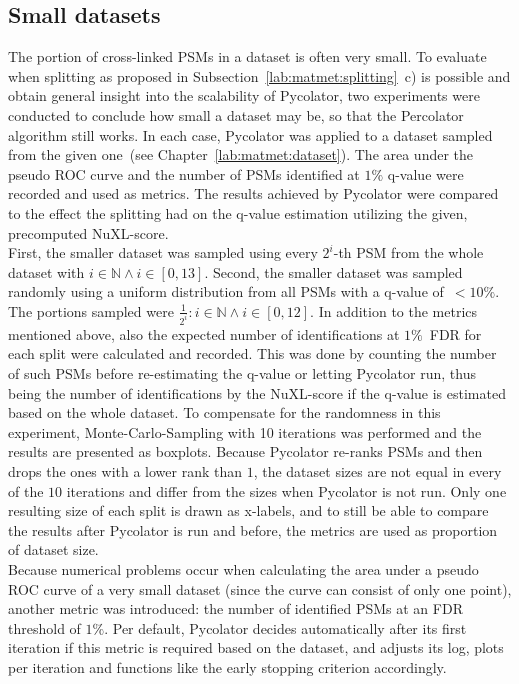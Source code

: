 \subsection{Small datasets}
\label{lab:matmet:small_datasets}
The portion of cross-linked PSMs in a dataset is often very small. To evaluate when splitting as proposed in Subsection~\ref{lab:matmet:splitting}~c) is possible and obtain general insight into the scalability of Pycolator, two experiments were conducted to conclude how small a dataset may be, so that the Percolator algorithm still works. In each case, Pycolator was applied to a dataset sampled from the given one~(see Chapter~\ref{lab:matmet:dataset}). The area under the pseudo ROC curve and the number of PSMs identified at $1\%$ q-value were recorded and used as metrics. The results achieved by Pycolator were compared to the effect the splitting had on the q-value estimation utilizing the given, precomputed NuXL-score.\\
First, the smaller dataset was sampled using every $2^i$-th PSM from the whole dataset with $i\in\mathbb{N} \land i\in[0,13]$. Second, the smaller dataset was sampled randomly using a uniform distribution from all PSMs with a q-value of~$<10\%$. The portions sampled were $\frac{1}{2^i} : i\in\mathbb{N} \land i\in[0,12]$. In addition to the metrics mentioned above, also the expected number of identifications at $1\%$~FDR for each split were calculated and recorded. This was done by counting the number of such PSMs before re-estimating the q-value or letting Pycolator run, thus being the number of identifications by the NuXL-score if the q-value is estimated based on the whole dataset.
To compensate for the randomness in this experiment, Monte-Carlo-Sampling with 10 iterations was performed and the results are presented as boxplots. Because Pycolator re-ranks PSMs and then drops the ones with a lower rank than $1$, the dataset sizes are not equal in every of the $10$ iterations and differ from the sizes when Pycolator is not run. Only one resulting size of each split is drawn as x-labels, and to still be able to compare the results after Pycolator is run and before, the metrics are used as proportion of dataset size.\\
Because numerical problems occur when calculating the area under a pseudo ROC curve of a very small dataset (since the curve can consist of only one point), another metric was introduced: the number of identified PSMs at an FDR threshold of $1\%$. Per default, Pycolator decides automatically after its first iteration if this metric is required based on the dataset, and adjusts its log, plots per iteration and functions like the early stopping criterion accordingly.\\\\
